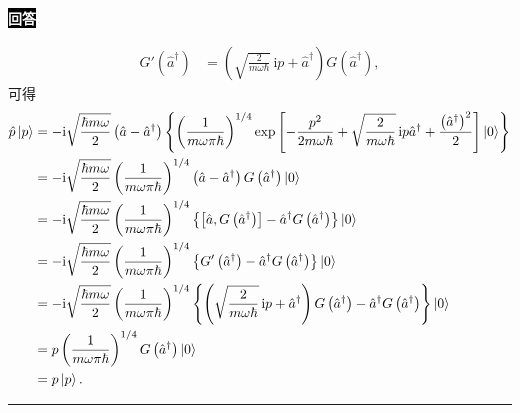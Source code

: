 \documentclass[11pt,a4paper]{ctexart}
\newenvironment{answer}
  {\par\smallskip\noindent
   \begingroup
   \setlength{\fboxsep}{4pt}%
   \colorbox{black}{\textcolor{white}{\bfseries 回答}}%
   \endgroup
   \quad\ignorespaces}
  {\par\smallskip\noindent\rule{\linewidth}{0.4pt}\medskip}
\begin{document}
\begin{answer}
\begin{enumerate}
\begin{equation}
\begin{aligned}
        G'\left(\hat{a}^\dag \right)
        &=\left(\sqrt{\frac{2}{m\omega\hbar}}\,\mathrm{i}p + \hat{a}^\dag \right) G\left(\hat{a}^\dag \right),
      \end{aligned}
    \end{equation}
    可得
    \begin{equation}
      \begin{aligned}
        \hat{p} \Ket{p }
        &=-\mathrm{i} \sqrt{\frac{\hbar m \omega }{2 } } \left(\hat{a}-\hat{a}^\dag \right) \left\{\left(\frac{1}{m\omega\pi\hbar}\right)^{1/4}\exp\left[-\frac{p^2}{2m\omega\hbar}+\sqrt{\frac{2}{m\omega\hbar}}\,\mathrm{i}p\hat a^\dagger+\frac{\left(\hat a^\dagger\right)^2}{2}\right]\Ket{0} \right\} \\
        &=-\mathrm{i} \sqrt{\frac{\hbar m \omega }{2 } } \left(\frac{1}{m\omega\pi\hbar}\right)^{1/4} \left(\hat{a}-\hat{a}^\dag \right) G\left(\hat{a}^\dag \right) \Ket{0 } \\
        &=-\mathrm{i} \sqrt{\frac{\hbar m \omega }{2 } } \left(\frac{1}{m\omega\pi\hbar}\right)^{1/4} \left\{\left[\hat{a},G\left(\hat{a}^\dag \right) \right]-\hat{a}^\dag G\left(\hat{a}^\dag \right) \right\}  \Ket{0 } \\
        &=-\mathrm{i} \sqrt{\frac{\hbar m \omega }{2 } } \left(\frac{1}{m\omega\pi\hbar}\right)^{1/4} \left\{G'\left(\hat{a}^\dag \right)-\hat{a}^\dag G\left(\hat{a}^\dag \right) \right\}  \Ket{0 } \\
        &=-\mathrm{i} \sqrt{\frac{\hbar m \omega }{2 } } \left(\frac{1}{m\omega\pi\hbar}\right)^{1/4} \left\{\left(\sqrt{\frac{2}{m\omega\hbar}}\,\mathrm{i}p + \hat{a}^\dag \right) G\left(\hat{a}^\dag \right)-\hat{a}^\dag G\left(\hat{a}^\dag \right) \right\}  \Ket{0 } \\
        &=p \left(\frac{1}{m\omega\pi\hbar}\right)^{1/4} G\left(\hat{a}^\dag \right) \Ket{0 } \\
        &=p\Ket{p }.
      \end{aligned}
    \end{equation}
  \end{enumerate}
\end{answer}
\end{document}
